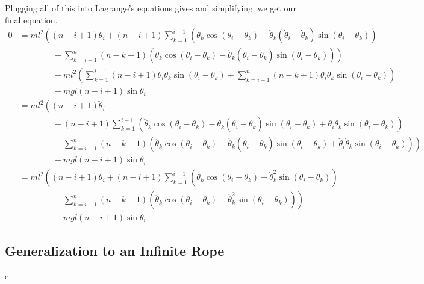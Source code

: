 \documentclass{article}
\begin{document}
Plugging all of this into Lagrange's equations gives and simplifying, we get our final equation.
\begin{align*}
0&=ml^2\left((n-i+1)\ddot\theta_i + (n-i+1)\sum_{k=1}^{i-1}\left(\ddot\theta_k\cos(\theta_i-\theta_k)-\dot\theta_k(\dot\theta_i-\dot\theta_k)\sin(\theta_i-\theta_k)\right)\right.\\
&\qquad\qquad+ \left.\sum_{k=i+1}^n(n-k+1)\left(\ddot\theta_k\cos(\theta_i-\theta_k)-\dot\theta_k(\dot\theta_i-\dot\theta_k)\sin(\theta_i-\theta_k)\right)\right)\\
&\qquad\qquad+ml^2\left(\sum_{k=1}^{i-1}(n-i+1)\dot\theta_i\dot\theta_k\sin(\theta_i-\theta_k) + \sum_{k=i+1}^n(n-k+1)\dot\theta_i\dot\theta_k\sin(\theta_i-\theta_k)\right)\\
&\qquad\qquad+ mgl(n-i+1)\sin\theta_i\\
&=ml^2\left((n-i+1)\ddot\theta_i\right.\\
&\qquad\qquad+ (n-i+1)\sum_{k=1}^{i-1}\left(\ddot\theta_k\cos(\theta_i-\theta_k)-\dot\theta_k(\dot\theta_i-\dot\theta_k)\sin(\theta_i-\theta_k)+\dot\theta_i\dot\theta_k\sin(\theta_i-\theta_k)\right)\\
&\qquad\qquad+ \left.\sum_{k=i+1}^n(n-k+1)\left(\ddot\theta_k\cos(\theta_i-\theta_k)-\dot\theta_k(\dot\theta_i-\dot\theta_k)\sin(\theta_i-\theta_k)+\dot\theta_i\dot\theta_k\sin(\theta_i-\theta_k)\right)\right)\\
&\qquad\qquad+ mgl(n-i+1)\sin\theta_i\\
&=ml^2\left((n-i+1)\ddot\theta_i + (n-i+1)\sum_{k=1}^{i-1}\left(\ddot\theta_k\cos(\theta_i-\theta_k)-\dot\theta_k^2\sin(\theta_i-\theta_k)\right)\right.\\
&\qquad\qquad+ \left.\sum_{k=i+1}^n(n-k+1)\left(\ddot\theta_k\cos(\theta_i-\theta_k)-\dot\theta_k^2\sin(\theta_i-\theta_k)\right)\right)\\
&\qquad\qquad+ mgl(n-i+1)\sin\theta_i
\end{align*}
\subsection{Generalization to an Infinite Rope}
e
\end{document}
